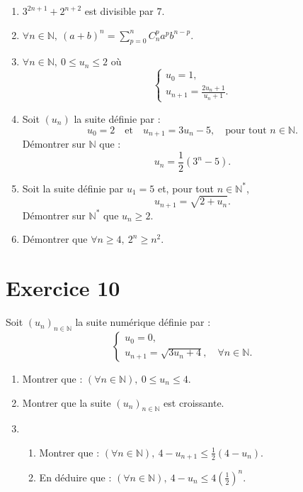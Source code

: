 \documentclass[a4paper,11pt]{article}
\begin{document}
\begin{enumerate}
    \item \(3^{2n+1} + 2^{n+2}\) est divisible par 7.
    \item \(\forall n \in \mathbb{N}, \ (a+b)^n = \sum_{p=0}^n C_n^p a^p b^{n-p}.\)
    \item \(\forall n \in \mathbb{N}, \ 0 \leq u_n \leq 2\) où
    \[
    \begin{cases}
    u_0 = 1, \\
    u_{n+1} = \frac{2u_n + 1}{u_n + 1}.
    \end{cases}
    \]

    \item Soit \((u_n)\) la suite définie par :
    \[
    u_0 = 2 \quad \text{et} \quad u_{n+1} = 3u_n - 5, \quad \text{pour tout } n \in \mathbb{N}.
    \]
    Démontrer sur \(\mathbb{N}\) que :
    \[
    u_n = \frac{1}{2}(3^n - 5).
    \]

    \item Soit la suite définie par \(u_1 = 5\) et, pour tout \(n \in \mathbb{N}^*\),
    \[
    u_{n+1} = \sqrt{2 + u_n}.
    \]
    Démontrer sur \(\mathbb{N}^*\) que \(u_n \geq 2\).

    \item Démontrer que \(\forall n \geq 4, \ 2^n \geq n^2.\)
\end{enumerate}

\section*{Exercice 10}

Soit \((u_n)_{n \in \mathbb{N}}\) la suite numérique définie par :
\[
\begin{cases}
u_0 = 0, \\
u_{n+1} = \sqrt{3u_n + 4}, \quad \forall n \in \mathbb{N}.
\end{cases}
\]

\begin{enumerate}
    \item Montrer que : \((\forall n \in \mathbb{N}), \ 0 \leq u_n \leq 4\).
    \item Montrer que la suite \((u_n)_{n \in \mathbb{N}}\) est croissante.
    \item 
    \begin{enumerate}
        \item Montrer que : \((\forall n \in \mathbb{N}), \ 4 - u_{n+1} \leq \frac{1}{2}(4 - u_n)\).
        \item En déduire que : \((\forall n \in \mathbb{N}), \ 4 - u_n \leq 4 \left(\frac{1}{2}\right)^n\).
    \end{enumerate}
\end{enumerate}
\end{document}
